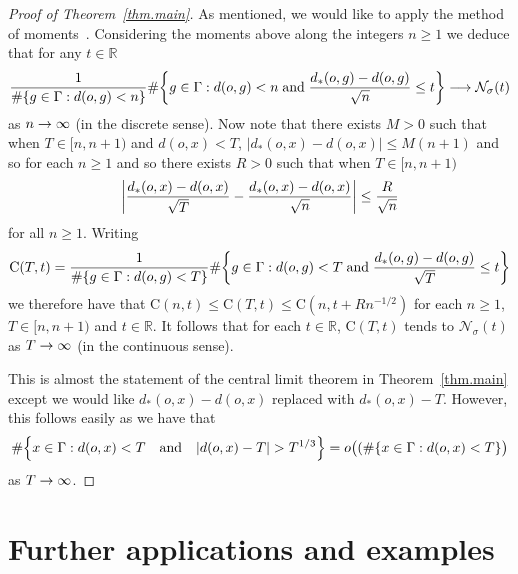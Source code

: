 \documentclass[AHL,Unicode,longabstracts,published]{cedram}
\newcommand{\G}{\Gamma}
\newcommand{\Nc}{\mathcal{N}}
\newcommand{\R}{\mathbb{R}}
\newcommand*\rmC{\mathrm{C}}
\let\originalleft\left
\let\originalright\right
\renewcommand{\left}{\mathopen{}\mathclose\bgroup\originalleft}
\renewcommand{\right}{\aftergroup\egroup\originalright}
\renewcommand*{\to}{\mathchoice{\longrightarrow}{\rightarrow}{\rightarrow}{\rightarrow}}
\theoremstyle{plain}
\newcommand{\G}{\Gamma}
\begin{document}
\begin{proof}[Proof of Theorem~\ref{thm.main}]
As mentioned, we would like to apply the method of moments~\cite[Theorem~30.2]{billingsley}. Considering the moments above along the integers $n\ge 1$ we deduce that for any $t\in\R$
\begin{align*}
\frac{1}{\#\left\{ g \in \G: d(o,g) < n\right\}}
 \#\left\{ g \in \G: d(o,g) < n\;\text{and}\; \frac{d_\ast(o,g) - d(o,g)}{\sqrt{n}} \le t \right\} \to \Nc_\sigma(t)
\end{align*}
as $n\to\infty$ (in the discrete sense). Now note that there exists $M>0$ such that when $T \in [n, n+1)$ and $d(o,x) < T$, $|d_\ast(o,x) - d(o,x)| \le M(n + 1)$ and so for each $n \ge 1$ and so there exists $R >0$ such that when $T \in [n,n+1)$
\[
\left| \frac{d_\ast(o,x) - d(o,x)}{\sqrt{T}} - \frac{d_\ast(o,x) - d(o,x)}{\sqrt{n}}\right| \le \frac{R}{\sqrt{n}}
\]
for all $n\ge 1$. Writing
\begin{align*}
\rmC(T,t) = \frac{1}{\#\{ g \in \G: d(o,g) < T\}}
\#\left\{ g \in \G: d(o,g) < T \;\text{and}\; \frac{d_\ast(o,g) - d(o,g)}{\sqrt{T}} \le t \right\}
\end{align*}
we therefore have that $\rmC(n,t) \le \rmC(T,t) \le \rmC(n, t + Rn^{-1/2})$ for each $n\ge 1$, $T \in [n,n+1)$ and $t \in \R$. It follows that for each $t \in \R$, $\rmC(T,t)$ tends to $\Nc_\sigma(t)$ as $T\to\infty$ (in the continuous sense).

This is almost the statement of the central limit theorem in Theorem~\ref{thm.main} except we would like $d_\ast(o,x) - d(o,x)$ replaced with $d_\ast(o,x) - T$. However, this follows easily as we have that
\[
\#\left\{ x\in \G: d(o,x) < T \quad\text{and}\quad |d(o,x) - T| > T^{1/3}\right\} = o\bigl((\#\{ x \in \G: d(o,x) < T\}\bigr)
\]
as $T\to\infty$.
\end{proof}
\section{Further applications and examples}\label{sect4}
\end{document}
